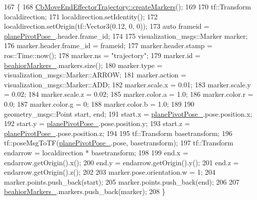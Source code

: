 \begin{DoxyCode}
167     \{
168         \hyperlink{classcl__move__group__interface_1_1CbMoveEndEffectorTrajectory_a442efa1d5bc9e9a16f74ecd31b13d9b5}{CbMoveEndEffectorTrajectory::createMarkers}();
169 
170         tf::Transform localdirection;
171         localdirection.setIdentity();
172         localdirection.setOrigin(tf::Vector3(0.12, 0, 0));
173         \textcolor{keyword}{auto} frameid = \hyperlink{classcl__move__group__interface_1_1CbCircularPivotMotion_a0994efbe93b9f9a61fcf3703c360cda2}{planePivotPose\_}.header.frame\_id;
174 
175         visualization\_msgs::Marker marker;
176         marker.header.frame\_id = frameid;
177         marker.header.stamp = ros::Time::now();
178         marker.ns = \textcolor{stringliteral}{"trajectory"};
179         marker.id = \hyperlink{classcl__move__group__interface_1_1CbMoveEndEffectorTrajectory_a809fb5385adf27c0a1c8f8136566949c}{beahiorMarkers\_}.markers.size();
180         marker.type = visualization\_msgs::Marker::ARROW;
181         marker.action = visualization\_msgs::Marker::ADD;
182         marker.scale.x = 0.01;
183         marker.scale.y = 0.02;
184         marker.scale.z = 0.02;
185         marker.color.a = 1.0;
186         marker.color.r = 0.0;
187         marker.color.g = 0;
188         marker.color.b = 1.0;
189 
190         geometry\_msgs::Point start, end;
191         start.x = \hyperlink{classcl__move__group__interface_1_1CbCircularPivotMotion_a0994efbe93b9f9a61fcf3703c360cda2}{planePivotPose\_}.pose.position.x;
192         start.y = \hyperlink{classcl__move__group__interface_1_1CbCircularPivotMotion_a0994efbe93b9f9a61fcf3703c360cda2}{planePivotPose\_}.pose.position.y;
193         start.z = \hyperlink{classcl__move__group__interface_1_1CbCircularPivotMotion_a0994efbe93b9f9a61fcf3703c360cda2}{planePivotPose\_}.pose.position.z;
194 
195         tf::Transform basetransform;
196         tf::poseMsgToTF(\hyperlink{classcl__move__group__interface_1_1CbCircularPivotMotion_a0994efbe93b9f9a61fcf3703c360cda2}{planePivotPose\_}.pose, basetransform);
197         tf::Transform endarrow = localdirection * basetransform;
198 
199         end.x = endarrow.getOrigin().x();
200         end.y = endarrow.getOrigin().y();
201         end.z = endarrow.getOrigin().z();
202 
203         marker.pose.orientation.w = 1;
204         marker.points.push\_back(start);
205         marker.points.push\_back(end);
206 
207         \hyperlink{classcl__move__group__interface_1_1CbMoveEndEffectorTrajectory_a809fb5385adf27c0a1c8f8136566949c}{beahiorMarkers\_}.markers.push\_back(marker);
208     \}
\end{DoxyCode}
